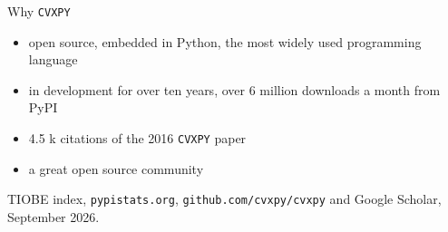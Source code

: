 \documentclass[10pt,mathserif,aspectratio=169]{beamer}
\newcommand{\bul}{\setlength\itemsep{1.1ex}}
\newcommand{\cvxpy}{\texttt{CVXPY}}
\begin{document}
\begin{frame}[label=bk-whycvxpy]{Why \cvxpy{}}
\vspace{-0.5ex}
\begin{itemize}\small\bul
  \item open source, embedded in Python, the most widely used programming language
  \item in development for over ten years, over 6 million downloads a month from PyPI
  \item 4.5 k citations of the 2016 \cvxpy{} paper
  \item a great open source community
\end{itemize}
\vfill
{\scriptsize\color{black!55} TIOBE index, \texttt{pypistats.org},
\texttt{github.com/cvxpy/cvxpy} and Google Scholar, September 2026.}
\end{frame}
\end{document}
